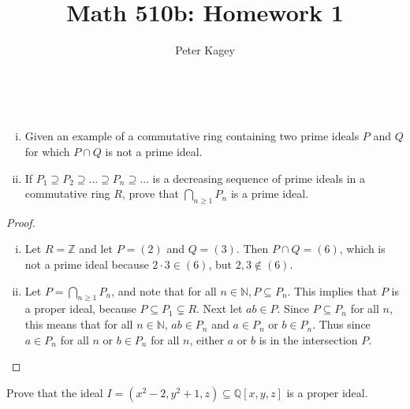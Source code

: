 \documentclass{article}
\newenvironment{problem}[2][Problem]{\begin{trivlist}
\item[\hskip \labelsep {\bfseries #1}\hskip \labelsep {\bfseries #2.}]}{\end{trivlist}}
\newcommand{\paren}[1]{\left( #1 \right)}
\begin{document}
\title{Math 510b: Homework 1}
\author{Peter Kagey}

\maketitle

\begin{problem}{5.3} ~
  \begin{enumerate}[(i)]
    \item Given an example of a commutative ring containing two prime ideals $P$ and $Q$
      for which $P \cap Q$ is not a prime ideal.
    \item If $P_1 \supseteq P_2 \supseteq \hdots \supseteq P_n \supseteq \hdots$
      is a decreasing sequence of prime ideals in a commutative ring $R$, prove
      that $\bigcap_{n \geq 1} P_n$ is a prime ideal.
  \end{enumerate}
\end{problem}

\begin{proof} ~
  \begin{enumerate}[(i)]
    \item Let $R = \mathbb Z$ and let $P = \paren 2$ and $Q = \paren 3$.
    Then $P \cap Q = \paren 6$, which is not a prime ideal because
    $2 \cdot 3 \in \paren 6$, but $2,3 \not\in \paren 6$.

    \item Let $P = \bigcap_{n \geq 1} P_n$, and note that for all
    $n \in \mathbb N, P \subseteq P_n$. This implies that $P$ is a proper ideal,
    because $P \subseteq P_1 \subsetneq R$.
    Next let $ab \in P$. Since $P \subseteq P_n$ for all $n$, this means that
    for all $n \in \mathbb N$, $ab \in P_n$ and $a \in P_n$ or $b \in P_n$. Thus
    since $a \in P_n$ for all $n$ or $b \in P_n$ for all $n$, either $a$ or $b$
    is in the intersection $P$.
  \end{enumerate}
\end{proof}
\vspace{1cm}
\begin{problem}{5.6}
  Prove that the ideal $I = \paren{x^2 - 2, y^2 + 1, z} \subseteq \mathbb Q[x,y,z]$ is a
  proper ideal.
\end{problem}
\end{document}
